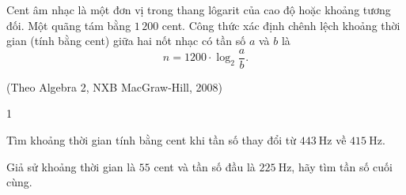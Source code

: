 \begin{baitap}%
	Cent âm nhạc là một đơn vị trong thang lôgarit của cao độ hoặc khoảng tương đối. Một quãng tám bằng $ 1\,200 $ cent. Công thức xác định chênh lệch khoảng thời gian (tính bằng cent) giữa hai nốt nhạc có tần số $a$ và $b$ là
	$$n=1200 \cdot \log_2 \dfrac{a}{b}.$$
	\begin{flushright}
		(Theo Algebra 2, NXB MacGraw-Hill, 2008)
	\end{flushright}
	\begin{enumEX}{1}
		\item Tìm khoảng thời gian tính bằng cent khi tần số thay đổi từ $443 \mathrm{~Hz}$ về $415 \mathrm{~Hz}$.
		\item Giả sử khoảng thời gian là $ 55 $ cent và tần số đầu là $225 \mathrm{~Hz}$, hãy tìm tần số cuối cùng.
	\end{enumEX}
\end{baitap}